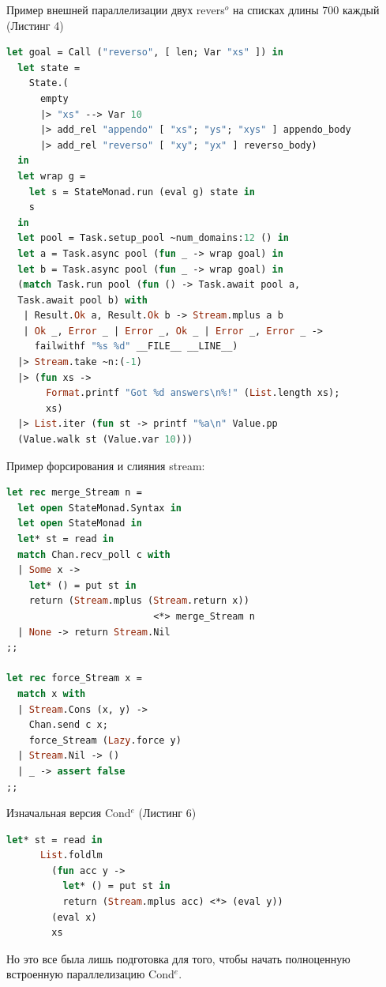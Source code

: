 Пример внешней параллелизации двух revers$^o$ на списках длины 700 каждый (Листинг 4)

\begin{lstlisting}[caption=Параллелизация двух revers$^o$ на списках длины 700, language=OCaml, frame=single]
  let goal = Call ("reverso", [ len; Var "xs" ]) in
  let state =
    State.(
      empty
      |> "xs" --> Var 10
      |> add_rel "appendo" [ "xs"; "ys"; "xys" ] appendo_body
      |> add_rel "reverso" [ "xy"; "yx" ] reverso_body)
  in
  let wrap g =
    let s = StateMonad.run (eval g) state in
    s
  in
  let pool = Task.setup_pool ~num_domains:12 () in
  let a = Task.async pool (fun _ -> wrap goal) in
  let b = Task.async pool (fun _ -> wrap goal) in
  (match Task.run pool (fun () -> Task.await pool a, 
  Task.await pool b) with
   | Result.Ok a, Result.Ok b -> Stream.mplus a b
   | Ok _, Error _ | Error _, Ok _ | Error _, Error _ ->
     failwithf "%s %d" __FILE__ __LINE__)
  |> Stream.take ~n:(-1)
  |> (fun xs ->
       Format.printf "Got %d answers\n%!" (List.length xs);
       xs)
  |> List.iter (fun st -> printf "%a\n" Value.pp 
  (Value.walk st (Value.var 10)))
\end{lstlisting}

Пример форсирования и слияния stream:

\begin{lstlisting}[caption=merge stream, language=OCaml, frame=single]
  let rec merge_Stream n =
  let open StateMonad.Syntax in
  let open StateMonad in
  let* st = read in
  match Chan.recv_poll c with
  | Some x ->
    let* () = put st in
    return (Stream.mplus (Stream.return x)) 
                          <*> merge_Stream n
  | None -> return Stream.Nil
;;

let rec force_Stream x =
  match x with
  | Stream.Cons (x, y) ->
    Chan.send c x;
    force_Stream (Lazy.force y)
  | Stream.Nil -> ()
  | _ -> assert false
;;
\end{lstlisting}

Изначальная версия Cond$^e$ (Листинг 6)


\begin{lstlisting}[caption=parallel cond$^e$, language=OCaml, frame=single]
  let* st = read in
      List.foldlm
        (fun acc y ->
          let* () = put st in
          return (Stream.mplus acc) <*> (eval y))
        (eval x)
        xs
\end{lstlisting}

Но это все была лишь подготовка для того, чтобы начать полноценную встроенную параллелизацию Cond$^e$. 


